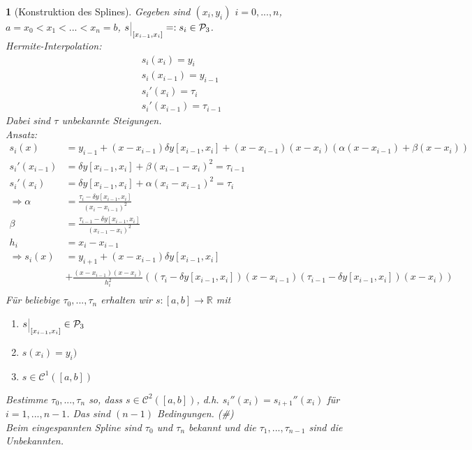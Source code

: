 \documentclass[12pt]{article}
\theoremstyle{break}
\newtheorem{nothing}[theorem]{}
\begin{document}
\begin{nothing}[Konstruktion des Splines]
Gegeben sind $(x_i, y_i)$ $i=0,...,n$, $a = x_0 < x_1 < ... < x_n = b$, $s\,\rule[-2mm]{0.1mm}{5mm}_{\thinspace [x_{i-1}, x_i]} =: s_i \in \mathcal{P}_3$. \\
Hermite-Interpolation:
\begin{align*}
&s_i(x_i) = y_i &\\
&s_i(x_{i-1}) = y_{i-1} &\\
&s_i'(x_i) = \tau_i &\\
&s_i'(x_{i-1}) = \tau_{i-1}
\end{align*}
Dabei sind $\tau$ unbekannte Steigungen. \\
Ansatz: 
\begin{align*}
s_i(x) &= y_{i-1} + (x-x_{i-1}) \delta y[x_{i-1}, x_i] + (x-x_{i-1})(x-x_i) \left( \alpha (x-x_{i-1}) + \beta (x-x_i) \right) &\\
s_i'(x_{i-1}) &= \delta y[x_{i-1}, x_i] + \beta (x_{i-1} - x_i)^2 = \tau_{i-1} &\\
s_i'(x_i) &= \delta y[x_{i-1}, x_i] + \alpha (x_i - x_{i-1})^2 = \tau_i &\\
\Rightarrow \alpha &= \frac{\tau_i - \delta y[x_{i-1}, x_i]}{(x_i - x_{i-1})^2} &\\
\beta &= \frac{\tau_{i-1} - \delta y[x_{i-1}, x_i]}{(x_{i-1}- x_i)^2} &\\
h_i &= x_i-x_{i-1} &\\
\Rightarrow s_i(x) &= y_{i+1} + (x-x_{i-1}) \delta y [x_{i-1}, x_i] &\\ 
&+ \frac{(x-x_{i-1} )(x-x_i)}{h_i^2} \left( (\tau_i - \delta y[x_{i-1},x_i])(x-x_{i-1})(\tau_{i-1} - \delta y[x_{i-1},x_i])(x-x_i) \right) &\\
\end{align*}
Für beliebige $\tau_0,..., \tau_n$ erhalten wir $s: [a,b] \rightarrow \mathbb{R}$ mit 
\begin{enumerate}
  \item[i)] $s\,\rule[-2mm]{0.1mm}{5mm}_{\thinspace [x_{i-1}, x_i]} \in \mathcal{P}_3$
  \item[ii)] $s(x_i) = y_i)$
  \item[iii)] $s \in \mathcal{C}^1([a,b])$
\end{enumerate} 
Bestimme $\tau_0,..., \tau_n$ so, dass $s \in \mathcal{C}^2([a,b])$, d.h. $s_i''(x_i) = s_{i+1}''(x_i)$ für $i=1,...,n-1$. Das sind $(n-1)$ Bedingungen. (\#) \\
Beim eingespannten Spline sind $\tau_0$ und $\tau_n$ bekannt und die $\tau_1, ..., \tau_{n-1}$ sind die Unbekannten. \\

\end{nothing}
\end{document}

